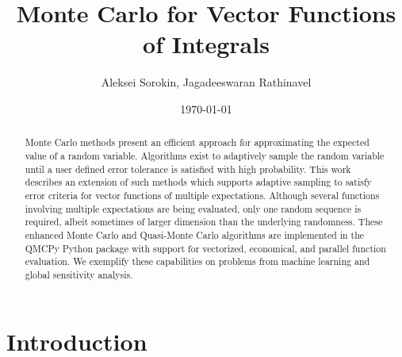\documentclass{article}[12pt]
\title{Monte Carlo for Vector Functions of Integrals}
\author{Aleksei Sorokin, Jagadeeswaran Rathinavel}
\date{\today}
\begin{document}
\maketitle

\begin{abstract}
Monte Carlo methods present an efficient approach for approximating the expected value of a random variable. Algorithms exist to adaptively sample the random variable until a user defined error tolerance is satisfied with high probability. This work describes an extension of such methods which supports adaptive sampling to satisfy error criteria for vector functions of multiple expectations. Although several functions involving multiple expectations are being evaluated, only one random sequence is required, albeit sometimes of larger dimension than the underlying randomness. These enhanced Monte Carlo and Quasi-Monte Carlo algorithms are implemented in the QMCPy Python package with support for vectorized, economical, and parallel function evaluation. We exemplify these capabilities on problems from machine learning and global sensitivity analysis.
\end{abstract}

\tableofcontents

\newpage

\section{Introduction}
\end{document}
